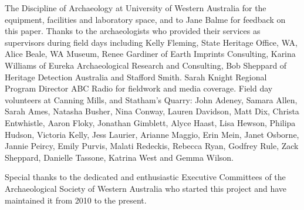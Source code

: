 \documentclass{ijsra}
\begin{document}

The Discipline of Archaeology at University of Western Australia for the equipment, facilities and laboratory space, and to Jane Balme for feedback on this paper. Thanks to the archaeologists who provided their services as supervisors during field days including Kelly Fleming, State Heritage Office, WA, Alice Beale, WA Museum, Renee Gardiner of Earth Imprints Consulting, Karina Williams of Eureka Archaeological Research and Consulting, Bob Sheppard of Heritage Detection Australia and Stafford Smith. Sarah Knight Regional Program Director ABC Radio for fieldwork and media coverage. Field day volunteers at Canning Mills, and Statham’s Quarry: John Adeney, Samara Allen, Sarah Ames, Natasha Busher, Nina Conway, Lauren Davidson, Matt Dix, Christa Entwhistle, Aaron Floky, Jonathan Gimblett, Alyce Haast, Lisa Hewson, Philipa Hudson, Victoria Kelly, Jess Laurier, Arianne Maggio, Erin Mein, Janet Osborne, Jannie Peircy, Emily Purvis, Malati Redeckis, Rebecca Ryan, Godfrey Rule, Zack Sheppard, Danielle Tassone, Katrina West and Gemma Wilson.

Special thanks to the dedicated and enthusiastic Executive Committees of the Archaeological Society of Western Australia who started this project and have maintained it from 2010 to the present.


\IJSRAclosing
\end{document}
